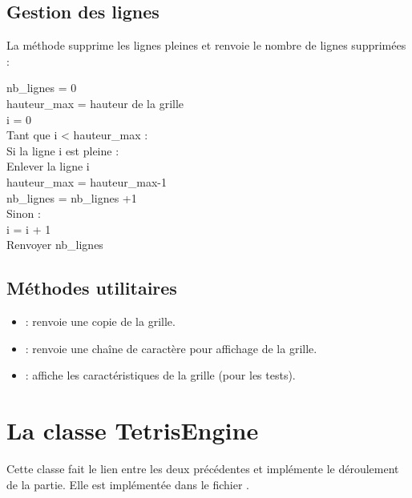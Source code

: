 \subsection{Gestion des lignes}
La méthode  supprime les lignes pleines et renvoie le nombre de lignes supprimées :
\begin{python}
	nb\_lignes = 0\\
	hauteur\_max = hauteur de la grille\\
	i = 0\\
	Tant que i < hauteur\_max :\\
	Si la ligne i est pleine :\\
	Enlever la ligne i\\
	hauteur\_max = hauteur\_max-1\\
	nb\_lignes = nb\_lignes +1\\
	Sinon :\\
	i = i + 1\\
	Renvoyer nb\_lignes
\end{python}

\subsection{Méthodes utilitaires}
\begin{itemize}
	\item {} : renvoie une copie de la grille.
	\item {} : renvoie une chaîne de caractère pour affichage de la grille.
	\item {} : affiche les caractéristiques de la grille (pour les tests).
\end{itemize}

\newpage

\section{La classe TetrisEngine}

Cette classe fait le lien entre les deux précédentes et implémente le déroulement de la partie. Elle est implémentée dans le fichier .

